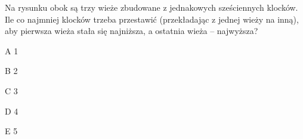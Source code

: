 \begin{tresc}
Na rysunku obok są trzy wieże zbudowane z jednakowych sześciennych klocków. Ile co najmniej klocków trzeba przestawić (przekładając z jednej wieży na inną), aby pierwsza wieża stała się najniższa, a ostatnia wieża – najwyższa?
\end{tresc}
\begin{wariant}{A} 1 \end{wariant}
\begin{wariant}{B} 2 \end{wariant}
\begin{wariant}{C} 3 \end{wariant}
\begin{wariant}{D} 4 \end{wariant}
\begin{wariant}{E} 5 \end{wariant}
